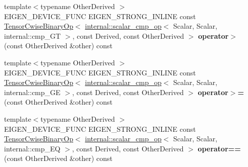 \begin{DoxyCompactItemize}
\item 
\mbox{\label{class_eigen_1_1_tensor_base_3_01_derived_00_01_read_only_accessors_01_4_a3190e81e52c1d7b72c102804be080ee9}} 
{\footnotesize template$<$typename Other\+Derived $>$ }\\E\+I\+G\+E\+N\+\_\+\+D\+E\+V\+I\+C\+E\+\_\+\+F\+U\+NC E\+I\+G\+E\+N\+\_\+\+S\+T\+R\+O\+N\+G\+\_\+\+I\+N\+L\+I\+NE const \hyperlink{class_eigen_1_1_tensor_cwise_binary_op}{Tensor\+Cwise\+Binary\+Op}$<$ \hyperlink{struct_eigen_1_1internal_1_1scalar__cmp__op}{internal\+::scalar\+\_\+cmp\+\_\+op}$<$ Scalar, Scalar, internal\+::cmp\+\_\+\+GT $>$, const Derived, const Other\+Derived $>$ {\bfseries operator$>$} (const Other\+Derived \&other) const
\item 
\mbox{\label{class_eigen_1_1_tensor_base_3_01_derived_00_01_read_only_accessors_01_4_af7c2188631206b9aecc9deb1d3e0fbb7}} 
{\footnotesize template$<$typename Other\+Derived $>$ }\\E\+I\+G\+E\+N\+\_\+\+D\+E\+V\+I\+C\+E\+\_\+\+F\+U\+NC E\+I\+G\+E\+N\+\_\+\+S\+T\+R\+O\+N\+G\+\_\+\+I\+N\+L\+I\+NE const \hyperlink{class_eigen_1_1_tensor_cwise_binary_op}{Tensor\+Cwise\+Binary\+Op}$<$ \hyperlink{struct_eigen_1_1internal_1_1scalar__cmp__op}{internal\+::scalar\+\_\+cmp\+\_\+op}$<$ Scalar, Scalar, internal\+::cmp\+\_\+\+GE $>$, const Derived, const Other\+Derived $>$ {\bfseries operator$>$=} (const Other\+Derived \&other) const
\item 
\mbox{\label{class_eigen_1_1_tensor_base_3_01_derived_00_01_read_only_accessors_01_4_ab6e4a0854dddfa08ed5a46c64d036bda}} 
{\footnotesize template$<$typename Other\+Derived $>$ }\\E\+I\+G\+E\+N\+\_\+\+D\+E\+V\+I\+C\+E\+\_\+\+F\+U\+NC E\+I\+G\+E\+N\+\_\+\+S\+T\+R\+O\+N\+G\+\_\+\+I\+N\+L\+I\+NE const \hyperlink{class_eigen_1_1_tensor_cwise_binary_op}{Tensor\+Cwise\+Binary\+Op}$<$ \hyperlink{struct_eigen_1_1internal_1_1scalar__cmp__op}{internal\+::scalar\+\_\+cmp\+\_\+op}$<$ Scalar, Scalar, internal\+::cmp\+\_\+\+EQ $>$, const Derived, const Other\+Derived $>$ {\bfseries operator==} (const Other\+Derived \&other) const
\item 
\mbox{\label{class_eigen_1_1_tensor_base_3_01_derived_00_01_read_only_accessors_01_4_aea240fca1f521fabc4f52ef4c4f72491}} 

\end{DoxyCompactItemize}
